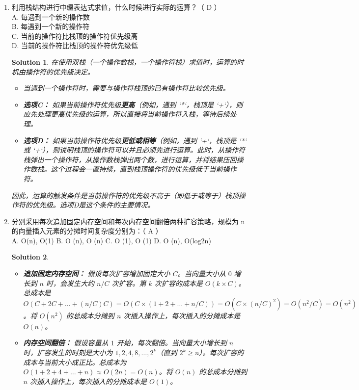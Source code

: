 \documentclass[UTF8]{report}
\newtheorem{solution}{Solution}
\theoremstyle{MyLineTheoremStyle} %
\theoremstyle{MyBlockTheoremStyle} %
\theoremstyle{MySubsubsectionStyle} %
\begin{document}
\begin{enumerate}
    \item 利用栈结构进行中缀表达式求值，什么时候进行实际的运算？（ D ）\\
    A. 每遇到一个新的操作数 \\
    B. 每遇到一个新的操作符 \\
    C. 当前的操作符比栈顶的操作符优先级高 \\
    D. 当前的操作符比栈顶的操作符优先级低
    \begin{solution}
        在使用双栈（一个操作数栈，一个操作符栈）求值时，运算的时机由操作符的优先级决定。
        \begin{itemize}
            \item 当遇到一个操作符时，需要与操作符栈顶的已有操作符比较优先级。
            \item \textbf{选项C：} 如果当前操作符优先级\textbf{更高}（例如，遇到 `*`，栈顶是 `+`），则应先处理更高优先级的运算，所以直接将当前操作符入栈，等待后续处理。
            \item \textbf{选项D：} 如果当前操作符优先级\textbf{更低或相等}（例如，遇到 `+`，栈顶是 `*` 或 `+`），则说明栈顶的操作符可以并且必须先进行运算。此时，从操作符栈弹出一个操作符，从操作数栈弹出两个数，进行运算，并将结果压回操作数栈。这个过程会一直持续，直到栈顶操作符的优先级低于当前操作符。
        \end{itemize}
        因此，运算的触发条件是当前操作符的优先级不高于（即低于或等于）栈顶操作符的优先级。选项D是这个条件的主要情况。
    \end{solution}

    \item 分别采用每次追加固定内存空间和每次内存空间翻倍两种扩容策略，规模为 n 的向量插入元素的分摊时间复杂度分别为：（ A ）\\
    A. O(n), O(1) \quad B. O (n), O (n) \quad C. O (1), O (1) \quad D. O (n), O(log2n)
    \begin{solution}
        \begin{itemize}
            \item \textbf{追加固定内存空间：} 假设每次扩容增加固定大小 $C$。当向量大小从 $0$ 增长到 $n$ 时，会发生大约 $n/C$ 次扩容。第 $k$ 次扩容的成本是 $O(k \times C)$。总成本是 $O(C + 2C + \ldots + (n/C)C) = O(C \times (1+2+\ldots+n/C)) = O(C \times (n/C)^2) = O(n^2/C) = O(n^2)$。将 $O(n^2)$ 的总成本分摊到 $n$ 次插入操作上，每次插入的分摊成本是 $O(n)$。
            \item \textbf{内存空间翻倍：} 假设容量从 $1$ 开始，每次翻倍。当向量大小增长到 $n$ 时，扩容发生的时刻是大小为 $1, 2, 4, 8, \ldots, 2^k$（直到 $2^k \geq n$）。每次扩容的成本与当前大小成正比。总成本为 $O(1 + 2 + 4 + \ldots + n) \approx O(2n) = O(n)$。将 $O(n)$ 的总成本分摊到 $n$ 次插入操作上，每次插入的分摊成本是 $O(1)$。
        \end{itemize}
    \end{solution}


\end{enumerate}
\end{document}
